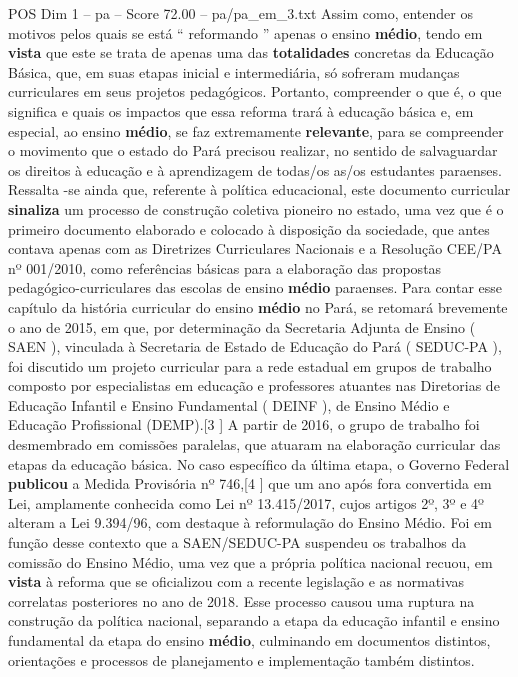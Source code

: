 \begin{textsample}{POS Dim 1 – pa – Score 72.00 – pa/pa\_em\_3.txt}
Assim como, entender os motivos pelos quais se está “ reformando ” apenas o ensino \textbf{médio}, tendo em \textbf{vista} que este se trata de apenas uma das \textbf{totalidades} concretas da Educação Básica, que, em suas etapas inicial e intermediária, só sofreram mudanças curriculares em seus projetos pedagógicos.
Portanto, compreender o que é, o que significa e quais os impactos que essa reforma trará à educação básica e, em especial, ao ensino \textbf{médio}, se faz extremamente \textbf{relevante}, para se compreender o movimento que o estado do Pará precisou realizar, no sentido de salvaguardar os direitos à educação e à aprendizagem de todas/os as/os estudantes paraenses.
Ressalta -se ainda que, referente à política educacional, este documento curricular \textbf{sinaliza} um processo de construção coletiva pioneiro no estado, uma vez que é o primeiro documento elaborado e colocado à disposição da sociedade, que antes contava apenas com as Diretrizes Curriculares Nacionais e a Resolução CEE/PA nº 001/2010, como referências básicas para a elaboração das propostas pedagógico-curriculares das escolas de ensino \textbf{médio} paraenses.
Para contar esse capítulo da história curricular do ensino \textbf{médio} no Pará, se retomará brevemente o ano de 2015, em que, por determinação da Secretaria Adjunta de Ensino ( SAEN ), vinculada à Secretaria de Estado de Educação do Pará ( SEDUC-PA ), foi discutido um projeto curricular para a rede estadual em grupos de trabalho composto por especialistas em educação e professores atuantes nas Diretorias de Educação Infantil e Ensino Fundamental ( DEINF ), de Ensino Médio e Educação Profissional (DEMP).[3 ] A partir de 2016, o grupo de trabalho foi desmembrado em comissões paralelas, que atuaram na elaboração curricular das etapas da educação básica.
No caso específico da última etapa, o Governo Federal \textbf{publicou} a Medida Provisória nº 746,[4 ] que um ano após fora convertida em Lei, amplamente conhecida como Lei nº 13.415/2017, cujos artigos 2º, 3º e 4º alteram a Lei 9.394/96, com destaque à reformulação do Ensino Médio.
Foi em função desse contexto que a SAEN/SEDUC-PA suspendeu os trabalhos da comissão do Ensino Médio, uma vez que a própria política nacional recuou, em \textbf{vista} à reforma que se oficializou com a recente legislação e as normativas correlatas posteriores no ano de 2018.
Esse processo causou uma ruptura na construção da política nacional, separando a etapa da educação infantil e ensino fundamental da etapa do ensino \textbf{médio}, culminando em documentos distintos, orientações e processos de planejamento e implementação também distintos.

\end{textsample}
